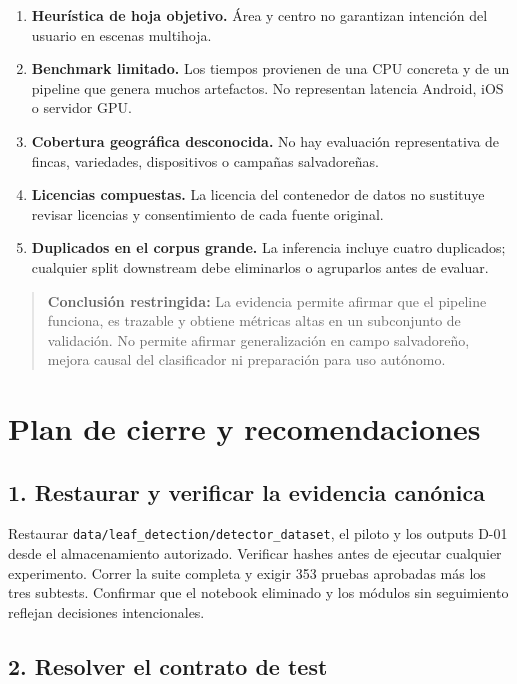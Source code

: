 \documentclass[11pt,a4paper]{article}
\begin{document}
\begin{enumerate}
\item \textbf{Heurística de hoja objetivo.} Área y centro no garantizan intención del usuario en escenas multihoja.

\item \textbf{Benchmark limitado.} Los tiempos provienen de una CPU concreta y de un pipeline que genera muchos artefactos. No representan latencia Android, iOS o servidor GPU.

\item \textbf{Cobertura geográfica desconocida.} No hay evaluación representativa de fincas, variedades, dispositivos o campañas salvadoreñas.

\item \textbf{Licencias compuestas.} La licencia del contenedor de datos no sustituye revisar licencias y consentimiento de cada fuente original.

\item \textbf{Duplicados en el corpus grande.} La inferencia incluye cuatro duplicados; cualquier split downstream debe eliminarlos o agruparlos antes de evaluar.

\end{enumerate}

\begin{quote}\textbf{Conclusión restringida:} La evidencia permite afirmar que el pipeline funciona, es trazable y obtiene métricas altas en un subconjunto de validación. No permite afirmar generalización en campo salvadoreño, mejora causal del clasificador ni preparación para uso autónomo.\end{quote}

\section{Plan de cierre y recomendaciones}

\subsection{1. Restaurar y verificar la evidencia canónica}

Restaurar \texttt{data/leaf\_detection/detector\_dataset}, el piloto y los outputs D-01 desde el almacenamiento autorizado. Verificar hashes antes de ejecutar cualquier experimento. Correr la suite completa y exigir 353 pruebas aprobadas más los tres subtests. Confirmar que el notebook eliminado y los módulos sin seguimiento reflejan decisiones intencionales.


\subsection{2. Resolver el contrato de test}
\end{document}
